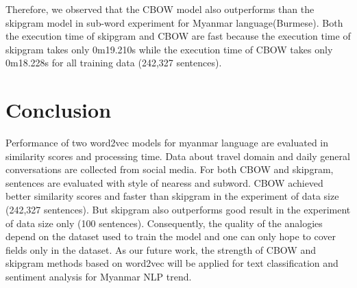\documentclass[conference]{IEEEtran}
\begin{document}
Therefore, we observed that the CBOW model also outperforms than the skipgram model in sub-word experiment for Myanmar language(Burmese). Both the execution time of skipgram and CBOW are fast because the execution time of skipgram takes only 0m19.210s while the execution time of CBOW takes only 0m18.228s for all training data (242,327 sentences).

\section{Conclusion}\label{sec:Conclusion}
Performance of two word2vec models for myanmar language are evaluated in similarity scores and processing time. Data about travel domain and daily general conversations are collected from social media. For both CBOW and skipgram, sentences are evaluated with style of nearess and subword. CBOW achieved better similarity scores and faster than skipgram in the experiment of data size (242,327 sentences). But skipgram also outperforms good result in the experiment of data size only (100 sentences). Consequently, the quality of the analogies depend on the dataset used to train the model and one can only hope to cover fields only in the dataset. As our future work, the strength of CBOW and skipgram methods based on word2vec will be applied for text classification and sentiment analysis for Myanmar NLP trend.
\end{document}
